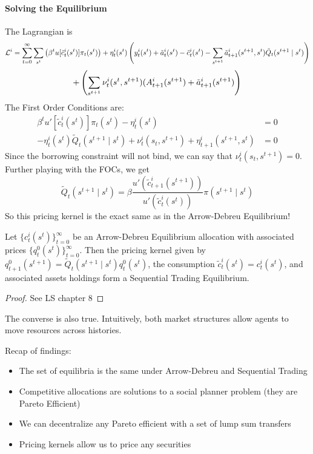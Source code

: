 \documentclass[10pt]{article}
\begin{document}
\paragraph{Solving the Equilibrium} The Lagrangian is
\[
\mathcal{L}^i = \sum_{t=0}^\infty \sum_{s^t} \left( \beta^t u[\tilde{c}^i_t(s^t)]\pi_t(s^t) \right) + \eta_t^i(s^t) \left( y_t^i(s^t) + \tilde{a}_t^i(s^t) - \tilde{c}_t^i(s^t) - \sum_{s^{t+1}} \tilde{a}^i_{t+1}(s^{t+1},s^t) \tilde{Q}_t(s^{t+1} \mid s^t) \right) 
\]
\[
+ \left( \sum_{s^{t+1}} \nu_t^i(s^t,s^{t+1})(A^i_{t+1}(s^{t+1}) + \tilde{a}_{t+1}^i(s^{t+1}) \right)
\]
The First Order Conditions are:
\begin{align*}
	\beta^t u'[\tilde{c}^i_t(s^t)]\pi_t(s^t) - \eta_t^i(s^t) &= 0 \\
	-\eta_t^i(s^t) \tilde{Q}_t(s^{t+1} \mid s^t) + \nu_t^i(s_t,s^{t+1}) + \eta_{t+1}^i(s^{t+1},s^t) &= 0
\end{align*}
Since the borrowing constraint will not bind, we can say that $\nu_t^i(s_t,s^{t+1})  = 0$. Further playing with the FOCs, we get
\[
 \tilde{Q}_t(s^{t+1} \mid s^t) = \beta \frac{u'(\tilde{c}^i_{t+1}(s^{t+1}))}{u'(\tilde{c}^i_{t}(s^{t}))} \pi(s^{t+1} \mid s^t)
\]
So this pricing kernel is the exact same as in the Arrow-Debreu Equilibrium!

\begin{proposition}
	Let $\{c^i_t(s^t)\}_{t=0}^\infty$ be an Arrow-Debreu Equilibrium allocation with associated prices $\{q_t^0(s^t)\}_{t=0}^\infty$. Then the pricing kernel given by $q_{t+1}^0(s^{t+1}) = \tilde{Q}_t(s^{t+1} \mid s^t) q_t^0 (s^t)$, the consumption $\tilde{c}^i_t(s^t) = c^i_t(s^t)$, and associated assets holdings form a Sequential Trading Equilibrium.
\end{proposition}
\begin{proof}
	See LS chapter 8
\end{proof}

\begin{remark}
	The converse is also true. Intuitively, both market structures allow agents to move resources across histories.
\end{remark}

Recap of findings:
\begin{itemize}
	\item The set of equilibria is the same under Arrow-Debreu and Sequential Trading
	\item Competitive allocations are solutions to a social planner problem (they are Pareto Efficient)
	\item We can decentralize any Pareto efficient with a set of lump sum transfers
	\item Pricing kernels allow us to price any securities
\end{itemize}
\end{document}
